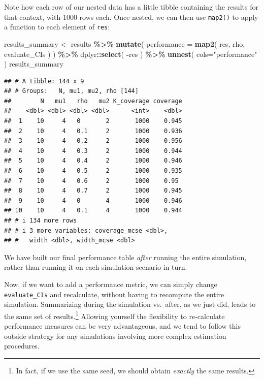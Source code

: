 \documentclass[
]{book}
\newenvironment{Shaded}{\begin{snugshade}}{\end{snugshade}}
\newcommand{\AttributeTok}[1]{\textcolor[rgb]{0.13,0.29,0.53}{#1}}
\newcommand{\FunctionTok}[1]{\textcolor[rgb]{0.13,0.29,0.53}{\textbf{#1}}}
\newcommand{\NormalTok}[1]{#1}
\newcommand{\OtherTok}[1]{\textcolor[rgb]{0.56,0.35,0.01}{#1}}
\newcommand{\SpecialCharTok}[1]{\textcolor[rgb]{0.81,0.36,0.00}{\textbf{#1}}}
\newcommand{\StringTok}[1]{\textcolor[rgb]{0.31,0.60,0.02}{#1}}
\begin{document}
Note how each row of our nested data has a little tibble containing the results for that context, with 1000 rows each.
Once nested, we can then use \texttt{map2()} to apply a function to each element of \texttt{res}:

\begin{Shaded}
\begin{Highlighting}[]
\NormalTok{results\_summary }\OtherTok{\textless{}{-}} 
\NormalTok{  results }\SpecialCharTok{\%\textgreater{}\%}
  \FunctionTok{mutate}\NormalTok{( }\AttributeTok{performance =} \FunctionTok{map2}\NormalTok{( res, rho, evaluate\_CIs ) ) }\SpecialCharTok{\%\textgreater{}\%}
\NormalTok{  dplyr}\SpecialCharTok{::}\FunctionTok{select}\NormalTok{( }\SpecialCharTok{{-}}\NormalTok{res ) }\SpecialCharTok{\%\textgreater{}\%}
  \FunctionTok{unnest}\NormalTok{( }\AttributeTok{cols=}\StringTok{"performance"}\NormalTok{ ) }
\NormalTok{results\_summary}
\end{Highlighting}
\end{Shaded}

\begin{verbatim}
## # A tibble: 144 x 9
## # Groups:   N, mu1, mu2, rho [144]
##        N   mu1   rho   mu2 K_coverage coverage
##    <dbl> <dbl> <dbl> <dbl>      <int>    <dbl>
##  1    10     4   0       2       1000    0.945
##  2    10     4   0.1     2       1000    0.936
##  3    10     4   0.2     2       1000    0.956
##  4    10     4   0.3     2       1000    0.944
##  5    10     4   0.4     2       1000    0.946
##  6    10     4   0.5     2       1000    0.935
##  7    10     4   0.6     2       1000    0.95 
##  8    10     4   0.7     2       1000    0.945
##  9    10     4   0       4       1000    0.946
## 10    10     4   0.1     4       1000    0.944
## # i 134 more rows
## # i 3 more variables: coverage_mcse <dbl>,
## #   width <dbl>, width_mcse <dbl>
\end{verbatim}

We have built our final performance table \emph{after} running the entire simulation, rather than running it on each simulation scenario in turn.

Now, if we want to add a performance metric, we can simply change \texttt{evaluate\_CIs} and recalculate, without having to recompute the entire simulation.
Summarizing during the simulation vs.~after, as we just did, leads to the same set of results.\footnote{In fact, if we use the same seed, we should obtain \emph{exactly} the same results.}
Allowing yourself the flexibility to re-calculate performance measures can be very advantageous, and we tend to follow this outside strategy for any simulations involving more complex estimation procedures.
\end{document}
